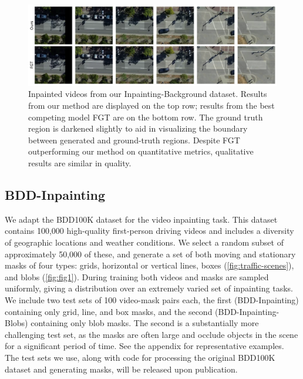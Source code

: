 \begin{figure}[t]
\centering
\includegraphics[width=\linewidth]{figures/bg_3119.pdf}
\caption{Inpainted videos from our Inpainting-Background dataset. Results from our method are displayed on the top row; results from the best competing model FGT \citep{fgt} are on the bottom row. The ground truth region is darkened slightly to aid in visualizing the boundary between generated and ground-truth regions. Despite FGT outperforming our method on quantitative metrics, qualitative results are similar in quality.}
\label{fig:background}
\end{figure}
\subsection{BDD-Inpainting}
We adapt the BDD100K \citep{bdd100k} dataset for the video inpainting task. This dataset contains 100,000 high-quality first-person driving videos and includes a diversity of geographic locations and weather conditions. We select a random subset of approximately 50,000 
of these, and generate a set of both moving and stationary masks of four types: grids, horizontal or vertical lines, boxes (\cref{fig:traffic-scenes}), and blobs (\cref{fig:fig1}). During training both videos and masks are sampled uniformly, giving a distribution over an extremely varied set of inpainting tasks. We include two test sets of 100 video-mask pairs each, the first (BDD-Inpainting) containing only grid, line, and box masks, and the second (BDD-Inpainting-Blobs) containing only blob masks. The second is a substantially more challenging test set, as the masks are often large and occlude objects in the scene for a significant period of time. See the appendix for representative examples. The test sets we use, along with code for processing the original BDD100K dataset and generating masks, will be released upon publication. 
